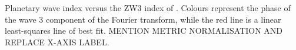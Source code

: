 \label{fig:metric_vs_zw3}
Planetary wave index versus the ZW3 index of \citet{Raphael2004}. Colours represent the phase of the wave 3 component of the Fourier transform, while the red line is a linear least-squares line of best fit. MENTION METRIC NORMALISATION AND REPLACE X-AXIS LABEL.